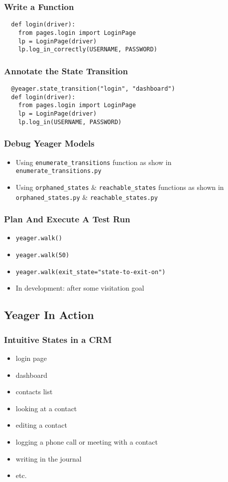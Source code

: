 \begin{frame}[fragile]
  \frametitle{Write a Function}
  \begin{lstlisting}
  def login(driver):
    from pages.login import LoginPage
    lp = LoginPage(driver)
    lp.log_in_correctly(USERNAME, PASSWORD)
  \end{lstlisting}
\end{frame}

\begin{frame}[fragile]
  \frametitle{Annotate the State Transition}
  \begin{lstlisting}
  @yeager.state_transition("login", "dashboard")
  def login(driver):
    from pages.login import LoginPage
    lp = LoginPage(driver)
    lp.log_in(USERNAME, PASSWORD)
  \end{lstlisting}
\end{frame}

\begin{frame}
  \frametitle{Debug Yeager Models}
  \begin{itemize}
    \item Using \texttt{enumerate\_transitions} function as show in \texttt{enumerate\_transitions.py} %
    \item Using \texttt{orphaned\_states} \& \texttt{reachable\_states} functions as shown in \texttt{orphaned\_states.py} \& \texttt{reachable\_states.py} %
  \end{itemize}
\end{frame}

\begin{frame}
  \frametitle{Plan And Execute A Test Run}
  \begin{itemize}
    \item \texttt{yeager.walk()}
    \item \texttt{yeager.walk(50)}
    \item \texttt{yeager.walk(exit\_state="state-to-exit-on")}
    \item In development: after some visitation goal
  \end{itemize}
\end{frame}

\subsection{Yeager In Action}

\begin{frame}
  \frametitle{Intuitive States in a CRM}
  \begin{itemize}
    \item login page
    \item dashboard
    \item contacts list
    \item looking at a contact
    \item editing a contact
    \item logging a phone call or meeting with a contact
    \item writing in the journal
    \item etc.
  \end{itemize}
\end{frame}

